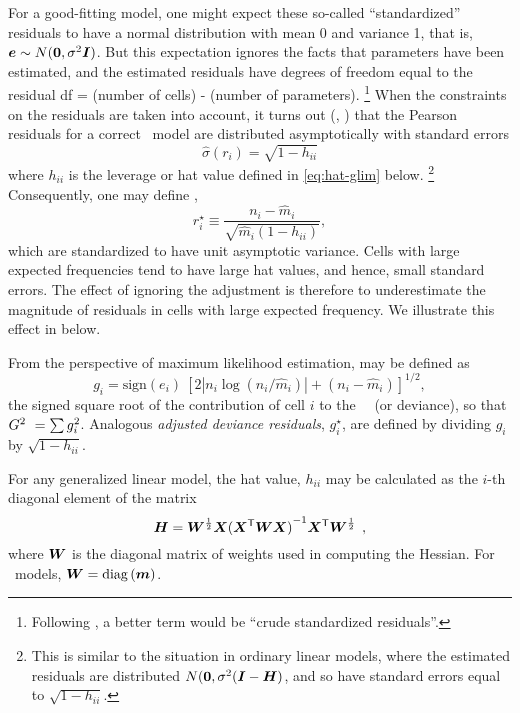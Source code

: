 For a good-fitting model, one might expect these so-called
``standardized'' residuals to have a normal distribution
with mean 0 and variance 1, that is, $\bm{e} \sim N ( \bm{0}, \sigma^2 \bm{I} )$.
But this expectation ignores the facts that parameters have been
estimated,
and the estimated residuals have degrees of freedom equal to
the residual df = (number of cells) - (number of parameters).%
\footnote{Following \citet{Christensen:97}, a better term
would be ``crude standardized residuals''.}
When the constraints on the residuals are taken into account,
it turns out (\citet[Section 12.4]{Agresti:90},
\citet[Section 10.7]{Christensen:97})
that the Pearson residuals for a correct \loglin\ model are
distributed asymptotically with standard errors
\begin{equation*}%
\hat{\sigma} ( r_i ) = \sqrt{ 1 - h_{ii} }
\end{equation*}
where $h_{ii}$ is the leverage or hat value defined in \eqref{eq:hat-glim} below.%
\footnote{This is similar to the situation in ordinary linear models,
where the estimated residuals are distributed $N ( \bm{0}, \sigma^2 (\bm{I} - \bm{H})$, and so have standard errors equal to $\sqrt{ 1 - h_{ii} }$.}
Consequently, one may define  \citep{Haberman:73,Haberman:74},
\begin{equation}\label{eq:streschi}
r_i^{\star} \equiv \frac{n_i - \widehat{m}_i}{\sqrt{ \widehat{m}_i ( 1 - h_{ii} )} } \comma
\end{equation}
which are standardized to have unit asymptotic variance.
Cells with large expected frequencies tend to have large hat values,
and hence, small standard errors.
The effect of ignoring the adjustment is therefore to underestimate
the magnitude of residuals in cells with large expected frequency.
We illustrate this effect in  below.

From the perspective of maximum likelihood estimation,
 may be defined as
\begin{equation}\label{eq:resdevg}
g_i  =
\mbox{sign} ( e_i ) \: \left[ 2
| n_i \log ( n_i / \widehat{m}_i ) | +  ( n_i - \widehat{m}_i ) \right] ^{1 / 2}
 \comma
\end{equation}
the signed
square root of the contribution of cell $i$ to the \LR\ \GSQ\
(or deviance), so that $G^2\ = \sum g_i^2$.
Analogous \emph{adjusted deviance residuals}, $g_i^{\star}$, are defined by dividing
$g_i$ by $\sqrt{ 1 - h_{ii}}$.

For any generalized linear model,  the
hat value, $h_{ii}$ may be calculated
as the $i$-th diagonal element of the matrix
\begin{equation}\label{eq:hat-glim}
\bm{H} = {\bm{W}}^\frac{1}{2} \bm{X}
{( \bm{X}^\mathsf{T} \bm{W} \bm{X})}^{-1} \bm{X}^\mathsf{T}  {\bm{W}}^\frac{1}{2}
 \:\: ,
\end{equation}
where $\bm{W}$ is the diagonal matrix of weights used in computing
the Hessian.  For \loglin\ models, $\bm{W} = \mathrm{diag}\, (\bm{m})$.


